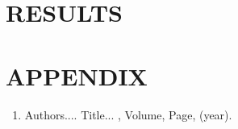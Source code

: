 \documentclass[Dual]{iitddiss}
\begin{document}
\chapter{RESULTS}
\label{chap:results}

\pagebreak


\appendix

\chapter{APPENDIX}
\label{chap:appendix}

\pagebreak


\label{chap:references}

\pagebreak


\listofpapers

\begin{enumerate}
\item Authors....  \newblock
 Title...
  , Volume,
  Page, (year).
\end{enumerate}
\end{document}
